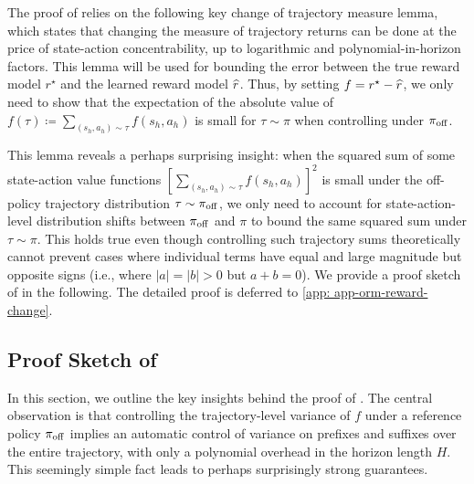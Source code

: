 \documentclass{article}
\begin{document}
The proof of  relies on the following key change of trajectory measure lemma, which states that changing the measure of trajectory returns can be done at the price of state-action concentrability, up to logarithmic and polynomial-in-horizon factors. This lemma will be used for bounding the error between the true reward model $r^\star$ and the learned reward model $\widehat{r}$. Thus, by setting $f = r^\star - \widehat{r}$, we only need to show that the expectation of the absolute value of $f(\tau)\coloneqq\sum_{(s_h,a_h)\sim\tau}f(s_h,a_h)$ is small for $\tau\sim \pi$ when controlling under $\pi_{\mathrm{off}}$.
This lemma reveals a perhaps surprising insight: when the squared sum of some state-action value functions $[\sum_{(s_h,a_h)\sim\tau}f(s_h,a_h)]^2$ is small under the off-policy trajectory distribution $\tau\sim\pi_{\mathrm{off}}$, we only need to account for state-action-level distribution shifts between $\pi_{\mathrm{off}}$ and $\pi$ to bound the same squared sum under $\tau\sim\pi$. This holds true even though controlling such trajectory sums theoretically cannot prevent cases where individual terms have equal and large magnitude but opposite signs (i.e., where $|a|=|b|>0$ but $a+b=0$).
We provide a proof sketch of  in the following. The detailed proof is deferred to \cref{app: app-orm-reward-change}.

\subsection{Proof Sketch of }

In this section, we outline the key insights behind the proof of . The central observation is that controlling the trajectory-level variance of $f$ under a reference policy $\pi_{\mathrm{off}}$ implies an automatic control of variance on prefixes and suffixes over the entire trajectory, with only a polynomial overhead in the horizon length $H$. This seemingly simple fact leads to perhaps surprisingly strong guarantees.
\end{document}
